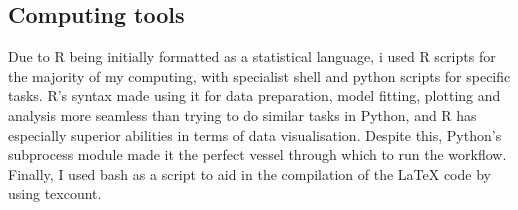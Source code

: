 \documentclass[11pt, a4paper, titlepage]{article}
\begin{document}
    \subsection*{Computing tools}
	Due to R being initially formatted as a statistical language, i used R scripts for the majority of my computing, with specialist shell and python scripts for specific tasks. R's syntax made using it for data preparation, model fitting, plotting and analysis more seamless than trying to do similar tasks in Python, and R has especially superior abilities in terms of data visualisation. Despite this, Python's subprocess module made it the perfect vessel through which to run the workflow. Finally, I used bash as a script to aid in the compilation of the LaTeX code by using texcount. 
    





    \clearpage
    

    
\end{document}
